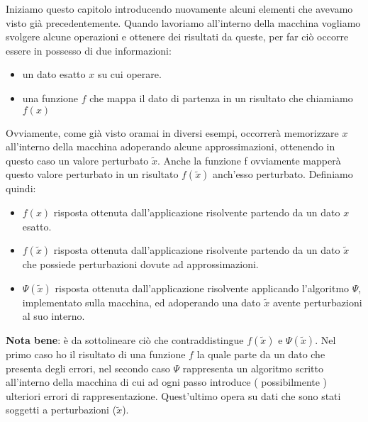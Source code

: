 \documentclass[12pt, a4paper]{book}
\theoremstyle{definition}
\begin{document}
\begin{flushleft}

Iniziamo questo capitolo introducendo nuovamente alcuni elementi che avevamo visto già precedentemente.  Quando lavoriamo all'interno della macchina vogliamo svolgere alcune operazioni e ottenere dei risultati da queste, per far ciò occorre essere in possesso di due informazioni: 
\begin{itemize}
	\item un dato esatto $x$ su cui operare.
	\item una funzione $f$ che mappa il dato di partenza in un risultato che chiamiamo $f(x)$
\end{itemize}
Ovviamente, come già visto oramai in diversi esempi,  occorrerà memorizzare $x$ all'interno della macchina adoperando alcune approssimazioni, ottenendo in questo caso un valore perturbato $\tilde{x}$. Anche la funzione f ovviamente mapperà questo valore perturbato in un risultato $f(\tilde{x})$ anch'esso perturbato. 
\vspace{1em}
Definiamo quindi: 
\begin{itemize}
	\item $f(x)$ risposta ottenuta dall'applicazione risolvente partendo da un dato $x$ esatto.
	\item $f(\tilde{x})$ risposta ottenuta dall'applicazione risolvente partendo da un dato $\tilde{x}$ che possiede perturbazioni dovute ad approssimazioni.
	\item $\Psi(\tilde{x})$ risposta ottenuta dall'applicazione risolvente applicando l'algoritmo $\Psi$, implementato sulla macchina, ed adoperando una dato  $\tilde{x}$ avente perturbazioni al suo interno. 
\end{itemize}

\textbf{Nota bene}: è da sottolineare ciò che contraddistingue $f(\tilde{x})$ e  $\Psi(\tilde{x})$. Nel primo caso ho il risultato di una funzione $f$ la quale parte da un dato che presenta degli errori, nel secondo caso $\Psi$ rappresenta un algoritmo scritto all'interno della macchina di cui ad ogni passo introduce ( possibilmente ) ulteriori errori di rappresentazione. Quest'ultimo opera su dati che sono stati soggetti a perturbazioni ($\tilde{x}$).
\end{flushleft}
\end{document}

